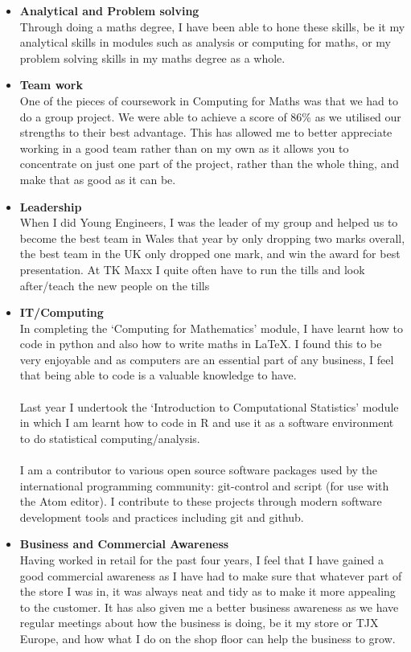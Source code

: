 \documentclass[10pt]{res}
\begin{document}
\begin{resume}
\begin{itemize}
\item \textbf{Analytical and Problem solving} \\
Through doing a maths degree, I have been able to hone these skills, be it my
analytical skills in modules such as analysis or computing for maths, or my
problem solving skills in my maths degree as a whole.

\item \textbf{Team work} \\
One of the pieces of coursework in Computing for Maths was that we had to do a
group project. We were able to achieve a score of 86\% as we utilised our
strengths to their best advantage.  This has allowed me to better appreciate
working in a good team rather than on my own as it allows you to concentrate on
just one part of the project, rather than the whole thing, and make that as good
as it can be.

\item \textbf{Leadership} \\
When I did Young Engineers, I was the leader of my group and helped us to become
the best team in Wales that year by only dropping two marks overall, the best
team in the UK only dropped one mark, and win the award for best presentation.
At TK Maxx I quite often have to run the tills and look after/teach the new
people on the tills

\item \textbf{IT/Computing} \\
In completing the ‘Computing for Mathematics’ module, I have learnt how to code
in python and also how to write maths in LaTeX. I found this to be very
enjoyable and as computers are an essential part of any business, I feel that
being able to code is a valuable knowledge to have. \\
\\
Last year I undertook the ‘Introduction to Computational Statistics’ module in
which I am learnt how to code in R and use it as a software environment to do
statistical computing/analysis. \\
\\
I am a contributor to various open source software packages used by the
international programming community: git-control and script (for use with the
Atom editor). I contribute to these projects through modern software development
tools and practices including git and github.

\item \textbf{Business and Commercial Awareness} \\
Having worked in retail for the past four years, I feel that I have gained a
good commercial awareness as I have had to make sure that whatever part of the
store I was in, it was always neat and tidy as to make it more appealing to the
customer. It has also given me a better business awareness as we have regular
meetings about how the business is doing, be it my store or TJX Europe, and how
what I do on the shop floor can help the business to grow.
\end{itemize}


\end{resume}
\end{document}
